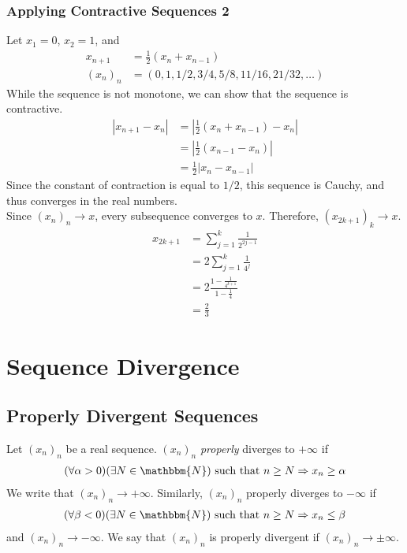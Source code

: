 \documentclass[10pt]{extarticle}
\newcommand{\N}{\mathbbm{N}}
\begin{document}
    \subsubsection{Applying Contractive Sequences 2}%
    Let $x_1 = 0$, $x_2 = 1$, and
    \begin{align*}
      x_{n+1} &= \frac{1}{2}(x_n + x_{n-1})\\
      (x_n)_n &= \left(0,1,1/2,3/4,5/8,11/16,21/32,\dots\right)
    \end{align*}
    While the sequence is not monotone, we can show that the sequence is contractive.
    \begin{align*}
      |x_{n+1}-x_n| &= \left|\frac{1}{2}\left(x_{n}+x_{n-1}\right) - x_n\right|\\
                    &= \left|\frac{1}{2}\left(x_{n-1}-x_n\right)\right|\\
                    &= \frac{1}{2}|x_n-x_{n-1}|
    \end{align*}
    Since the constant of contraction is equal to $1/2$, this sequence is Cauchy, and thus converges in the real numbers.\\

    Since $(x_n)_n\rightarrow x$, every subsequence converges to $x$. Therefore, $(x_{2k+1})_k\rightarrow x$.
    \begin{align*}
      x_{2k+1} &= \sum_{j=1}^{k} \frac{1}{2^{2j-1}}\\
               &= 2 \sum_{j=1}^{k}\frac{1}{4^j}\\
               &= 2 \frac{1-\frac{1}{4^{k+1}}}{1-\frac{1}{4}}\\
               &= \frac{2}{3} \tag*{$k\rightarrow\infty$}
    \end{align*}
  \section{Sequence Divergence}%
  \subsection{Properly Divergent Sequences}%
    Let $(x_n)_n$ be a real sequence. $(x_n)_n$ \textsl{properly} diverges to $+\infty$ if
    \begin{align*}
      (\forall \alpha > 0)(\exists N\in\N) \text{ such that } n\geq N \Rightarrow x_{n} \geq \alpha
    \end{align*}
    We write that $(x_n)_n \rightarrow +\infty$. Similarly, $(x_n)_n$ properly diverges to $-\infty$ if
    \begin{align*}
      (\forall \beta < 0)(\exists N\in\N) \text{ such that } n\geq N \Rightarrow x_n \leq \beta
    \end{align*}
    and $(x_n)_n \rightarrow -\infty$. We say that $(x_n)_n$ is properly divergent if $(x_n)_n\rightarrow \pm \infty$.\\
\end{document}
